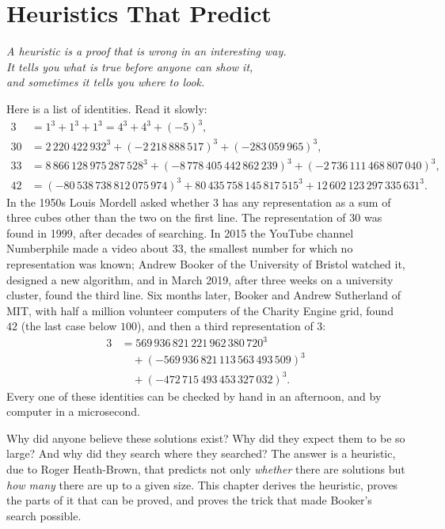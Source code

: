 \chapter{Heuristics That Predict}
\label{ch:heuristics}

\begin{center}\itshape
A heuristic is a proof that is wrong in an interesting way.\\
It tells you what is true before anyone can show it,\\
and sometimes it tells you where to look.
\end{center}

Here is a list of identities. Read it slowly:
\[
\begin{aligned}
3&=1^3+1^3+1^3=4^3+4^3+(-5)^3,\\
30&=2\,220\,422\,932^3+(-2\,218\,888\,517)^3+(-283\,059\,965)^3,\\
33&=8\,866\,128\,975\,287\,528^3+(-8\,778\,405\,442\,862\,239)^3+(-2\,736\,111\,468\,807\,040)^3,\\
42&=(-80\,538\,738\,812\,075\,974)^3+80\,435\,758\,145\,817\,515^3+12\,602\,123\,297\,335\,631^3.
\end{aligned}
\]
In the 1950s Louis Mordell asked whether $3$ has any representation as a sum of three cubes other than the two on the first line. The
representation of $30$ was found in 1999, after decades of searching. In 2015 the YouTube channel Numberphile made a video about $33$, the smallest number
for which no representation was known; Andrew Booker of the University of Bristol watched it, designed a new algorithm, and in March 2019, after three weeks on a
university cluster, found the third line. Six months later, Booker and Andrew Sutherland of MIT, with half a million volunteer computers of the
Charity Engine grid, found $42$ (the last case below $100$), and then a third representation of $3$:
\[
\begin{aligned}
3&=569\,936\,821\,221\,962\,380\,720^3\\
&\quad+(-569\,936\,821\,113\,563\,493\,509)^3\\
&\quad+(-472\,715\,493\,453\,327\,032)^3.
\end{aligned}
\]
Every one of these identities can be checked by hand in an afternoon, and by computer in a microsecond.

Why did anyone believe these solutions exist? Why did they expect them to be so large? And why did they search where they searched? The
answer is a heuristic, due to Roger Heath-Brown, that predicts not only \emph{whether} there are solutions but \emph{how many} there are up to a given size.
This chapter derives the heuristic, proves the parts of it that can be proved, and proves the trick that made Booker's search possible.

